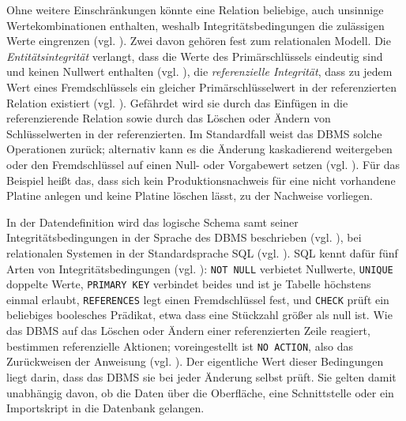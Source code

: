 Ohne weitere Einschränkungen könnte eine Relation beliebige, auch unsinnige
Wertekombinationen enthalten, weshalb Integritätsbedingungen die zulässigen
Werte eingrenzen (vgl. \cite[S.~70]{kudrassTaschenbuchRelationalesDatenmodell}).
Zwei davon gehören fest zum relationalen Modell. Die \emph{Entitätsintegrität}
verlangt, dass die Werte des Primärschlüssels eindeutig sind und keinen Nullwert
enthalten (vgl. \cite[S.~71]{kudrassTaschenbuchRelationalesDatenmodell}), die
\emph{referenzielle Integrität}, dass zu jedem Wert eines Fremdschlüssels ein
gleicher Primärschlüsselwert in der referenzierten Relation existiert (vgl.
\cite[S.~72]{kudrassTaschenbuchRelationalesDatenmodell}). Gefährdet wird sie
durch das Einfügen in die referenzierende Relation sowie durch das Löschen oder
Ändern von Schlüsselwerten in der referenzierten. Im Standardfall weist das DBMS
solche Operationen zurück; alternativ kann es die Änderung kaskadierend
weitergeben oder den Fremdschlüssel auf einen Null- oder Vorgabewert setzen
(vgl. \cite[S.~73\,f.]{kudrassTaschenbuchRelationalesDatenmodell}). Für das
Beispiel heißt das, dass sich kein Produktionsnachweis für eine nicht vorhandene
Platine anlegen und keine Platine löschen lässt, zu der Nachweise vorliegen.

In der Datendefinition wird das logische Schema samt seiner
Integritätsbedingungen in der Sprache des DBMS beschrieben (vgl.
\cite[S.~48]{kudrassTaschenbuchInformationsmodellierung}), bei relationalen
Systemen in der Standardsprache SQL (vgl.
\cite[S.~99]{kudrassTaschenbuchDatenbankspracheSQL}). SQL kennt dafür fünf
Arten von Integritätsbedingungen (vgl.
\cite[S.~128]{kudrassTaschenbuchDatenbankspracheSQL}): \texttt{NOT NULL}
verbietet Nullwerte, \texttt{UNIQUE} doppelte Werte, \texttt{PRIMARY KEY}
verbindet beides und ist je Tabelle höchstens einmal erlaubt, \texttt{REFERENCES}
legt einen Fremdschlüssel fest, und \texttt{CHECK} prüft ein beliebiges
boolesches Prädikat, etwa dass eine Stückzahl größer als null ist. Wie das DBMS
auf das Löschen oder Ändern einer referenzierten Zeile reagiert, bestimmen
referenzielle Aktionen; voreingestellt ist \texttt{NO ACTION}, also das
Zurückweisen der Anweisung (vgl.
\cite[S.~129]{kudrassTaschenbuchDatenbankspracheSQL}). Der eigentliche Wert
dieser Bedingungen liegt darin, dass das DBMS sie bei jeder Änderung selbst
prüft. Sie gelten damit unabhängig davon, ob die Daten über die Oberfläche, eine
Schnittstelle oder ein Importskript in die Datenbank gelangen.

